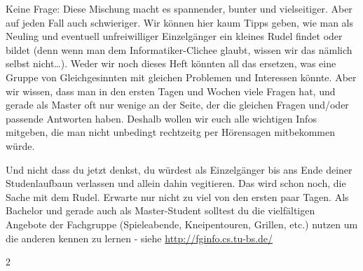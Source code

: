\begin{multicols}{2}
	Keine Frage: Diese Mischung macht es spannender, bunter und vielseitiger. Aber auf jeden Fall auch schwieriger. Wir können hier kaum Tipps geben, wie man als Neuling und eventuell unfreiwilliger Einzelgänger ein kleines Rudel findet oder bildet (denn wenn man dem Informatiker-Clichee glaubt, wissen wir das nämlich selbst nicht\ldots). Weder wir noch dieses Heft könnten all das ersetzen, was eine Gruppe von Gleichgesinnten mit gleichen Problemen und Interessen könnte. Aber wir wissen, dass man in den ersten Tagen und Wochen viele Fragen hat, und gerade als Master oft nur wenige an der Seite, der die gleichen Fragen und/oder passende Antworten haben. Deshalb wollen wir euch alle wichtigen Infos mitgeben, die man nicht unbedingt rechtzeitg per Hörensagen mitbekommen würde.

	Und nicht dass du jetzt denkst, du würdest als Einzelgänger bis ans Ende deiner Studenlaufbaun verlassen und allein dahin vegitieren. Das wird schon noch, die Sache mit dem Rudel. Erwarte nur nicht zu viel von den ersten paar Tagen. Als Bachelor und gerade auch als Master-Student solltest du die vielfältigen Angebote der Fachgruppe (Spieleabende, Kneipentouren, Grillen, etc.) nutzen um die anderen kennen zu lernen - siehe \url{http://fginfo.cs.tu-bs.de/}
\end{multicols}{2}